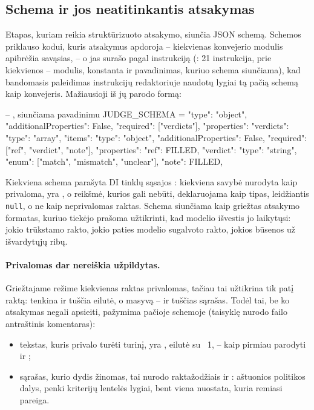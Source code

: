 \subsection{Schema ir jos neatitinkantis atsakymas}

Etapas, kuriam reikia struktūrizuoto atsakymo, siunčia JSON schemą. Schemos priklauso kodui,
kuris atsakymus apdoroja -- kiekvienas konvejerio modulis apibrėžia savąsias, -- o
 jas surašo pagal instrukciją (: 21 instrukcija, prie
kiekvienos -- modulis, konstanta ir pavadinimas, kuriuo schema siunčiama), kad bandomasis
paleidimas instrukcijų redaktoriuje naudotų lygiai tą pačią schemą kaip konvejeris. Mažiausioji
iš jų parodo formą:

\begin{codefile}{ -- , siunčiama pavadinimu }
JUDGE_SCHEMA = {
    "type": "object", "additionalProperties": False, "required": ["verdicts"],
    "properties": {"verdicts": {"type": "array", "items": {
        "type": "object", "additionalProperties": False, "required": ["ref", "verdict", "note"],
        "properties": {"ref": FILLED,
                       "verdict": {"type": "string", "enum": ["match", "mismatch", "unclear"]},
                       "note": FILLED}}}},
}
\end{codefile}

Kiekviena schema parašyta DI tinklų sąsajos : kiekviena savybė
nurodyta kaip privaloma,  yra , o reikšmė, kurios gali
nebūti, deklaruojama kaip tipas, leidžiantis \texttt{null}, o ne kaip neprivalomas raktas. Schema
siunčiama kaip griežtas atsakymo formatas, kuriuo tiekėjo prašoma užtikrinti, kad modelio išvestis jo
laikytųsi: jokio trūkstamo rakto, jokio paties modelio sugalvoto rakto, jokios būsenos už
išvardytųjų ribų.

\paragraph{Privalomas dar nereiškia užpildytas.}\label{par:models:filled} Griežtajame režime
kiekvienas raktas privalomas, tačiau tai užtikrina tik patį raktą: 
tenkina ir tuščia eilutė, o masyvą -- ir tuščias sąrašas. Todėl tai, be ko atsakymas negali
apsieiti, pažymima pačioje schemoje (taisyklę nurodo failo 
antraštinis komentaras):

\begin{itemize}
  \item tekstas, kuris privalo turėti turinį, yra , eilutė su
    ~1, -- kaip pirmiau parodyti  ir ;
  \item sąrašas, kurio dydis žinomas, tai nurodo raktažodžiais  ir
    : aštuonios politikos dalys, penki kriterijų lentelės lygiai, bent viena
    nuostata, kuria remiasi pareiga.
\end{itemize}

